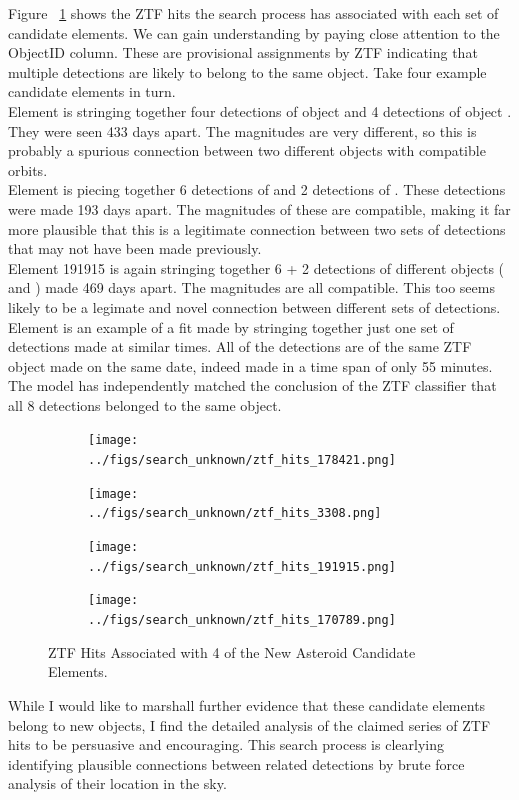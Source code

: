 Figure ~\ref{fig:ZtfHits} shows the ZTF hits the search process has associated with each set of candidate elements.
We can gain understanding by paying close attention to the ObjectID column.
These are provisional assignments by ZTF indicating that multiple detections are likely to belong to the same object.
Take four example candidate elements in turn.  \\
Element  is stringing together four detections of object  and 4 detections of object .
They were seen 433 days apart.  
The magnitudes are very different, so this is probably a spurious connection between two different objects with compatible orbits.\\
Element  is piecing together 6 detections of  and 2 detections of .
These detections were made 193 days apart.
The magnitudes of these are compatible, making it far more plausible that this is a legitimate connection between 
two sets of detections that may not have been made previously. \\
Element 191915 is again stringing together 6 + 2 detections of different objects ( and )
made 469 days apart.  The magnitudes are all compatible.  
This too seems likely to be a legimate and novel connection between different sets of detections. \\
Element  is an example of a fit made by stringing together just one set of detections
made at similar times.  All of the detections are of the same ZTF object  made on the same date,
indeed made in a time span of only 55 minutes.
The model has independently matched the conclusion of the ZTF classifier that all 8 detections belonged to the same object.
\begin{figure}[h]
\begin{subfigure}[t]{0.45\textwidth}
\centering
\texttt{[image: ../figs/search\_unknown/ztf\_hits\_178421.png]}
\end{subfigure}
\hfill
\begin{subfigure}[t]{0.45\textwidth}
\centering
\texttt{[image: ../figs/search\_unknown/ztf\_hits\_3308.png]}
\end{subfigure}
\bigskip
\begin{subfigure}[t]{0.45\textwidth}
\centering
\texttt{[image: ../figs/search\_unknown/ztf\_hits\_191915.png]}
\end{subfigure}
\hfill
\begin{subfigure}[t]{0.45\textwidth}
\centering
\texttt{[image: ../figs/search\_unknown/ztf\_hits\_170789.png]}
\end{subfigure}
\caption[ZTF Hits Associated with 4 of the New Asteroid Candidate Elements]
{ZTF Hits Associated with 4 of the New Asteroid Candidate Elements.}
\label{fig:ZtfHits}
\end{figure}
While I would like to marshall further evidence that these candidate elements belong to new objects,
I find the detailed analysis of the claimed series of ZTF hits to be persuasive and encouraging.
This search process is clearlying identifying plausible connections between related detections 
by brute force analysis of their location in the sky.

